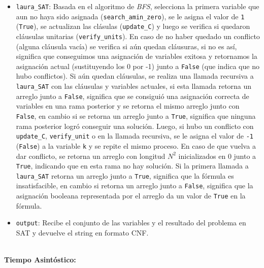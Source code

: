 \documentclass[letterpaper,12pt]{article}
\begin{document}
\begin{itemize}
	\item \texttt{laura\_SAT}: Basada en el algoritmo de \textit{BFS}, selecciona la primera variable que aun no haya sido asignada (\texttt{search\_amin\_zero}), se le asigna el valor de \texttt{1} (\texttt{True}), se actualizan las clásulas (\texttt{update\_C}) y luego se verifica si quedaron cláusulas unitarias (\texttt{verify\_units}). En caso de no haber quedado un conflicto (alguna cláusula vacía) se verifica si a\'un quedan cl\'ausuras, si no es as\'i, significa que conseguimos una asignaci\'on de variables exitosa y retornamos la asignaci\'on actual (sustituyendo los 0 por -1) junto a \texttt{False} (que indica que no hubo conflictos). Si a\'un quedan cl\'ausulas, se realiza una llamada recursiva a \texttt{laura\_SAT} con las cl\'ausulas y variables actuales, si esta llamada retorna un arreglo junto a \texttt{False}, significa que se consigui\'o una asignaci\'on correcta de variables en una rama posterior y se retorna el mismo arreglo junto con \texttt{False}, en cambio si se retorna un arreglo junto a \texttt{True}, significa que ninguna rama posterior logr\'o conseguir una soluci\'on. Luego, si hubo un conflicto con \texttt{update\_C}, \texttt{verify\_unit} o en la llamada recursiva, se le asigna el valor de \texttt{-1} (\texttt{False}) a la variable \texttt{k} y se repite el mismo proceso. En caso de que vuelva a dar conflicto, se retorna un arreglo con longitud $N^2$ inicializados en 0 junto a \texttt{True}, indicando que en esta rama no hay soluci\'on. Si la primera llamada a \texttt{laura\_SAT} retorna un arreglo junto a \texttt{True}, significa que la f\'ormula es insatisfacible, en cambio si retorna un arreglo junto a \texttt{False}, significa que la asignaci\'on booleana representada por el arreglo da un valor de \texttt{True} en la f\'ormula. 
	

	\item \texttt{output}: Recibe el conjunto de las variables y el resultado del problema en SAT y devuelve el string en formato CNF. \\ \\
\end{itemize}

\textbf{Tiempo Asintóstico:}
\end{document}
